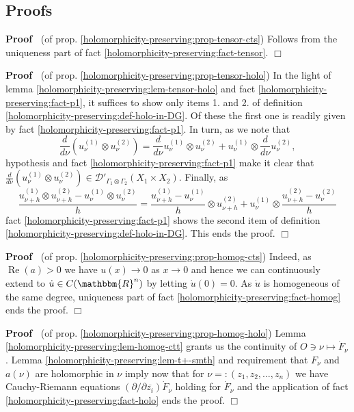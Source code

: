 \documentclass{article}
\newcommand{\nosymbol}{}
\newcommand{\tmop}[1]{\ensuremath{\operatorname{#1}}}
\renewenvironment{proof}{\noindent\textbf{Proof\ }}{\hspace*{\fill}$\Box$\medskip}
\theoremstyle{remark}
\begin{document}
\subsection{Proofs}

\begin{proof}
  (of prop. \ref{holomorphicity-preserving:prop-tensor-cts}) Follows from the
  uniqueness part of fact \ref{holomorphicity-preserving:fact-tensor}.
\end{proof}

\begin{proof}
  (of prop. \ref{holomorphicity-preserving:prop-tensor-holo}) In the light of
  lemma \ref{holomorphicity-preserving:lem-tensor-holo} and fact
  \ref{holomorphicity-preserving:fact-p1}, it suffices to show only items 1.
  and 2. of definition \ref{holomorphicity-preserving:def-holo-in-DG}. Of
  these the first one is readily given by fact
  \ref{holomorphicity-preserving:fact-p1}. In turn, as we note that
  \[ \frac{d}{d \nu} (u_{\nu}^{(1)} \otimes u_{\nu}^{(2)}) = \frac{d}{d \nu}
     u_{\nu}^{(1)} \otimes u_{\nu}^{(2)} + u_{\nu}^{(1)} \otimes \frac{d}{d
     \nu} u_{\nu}^{(2)}, \]
  hypothesis and fact \ref{holomorphicity-preserving:fact-p1} make it clear
  that $\frac{d}{d \nu} (u_{\nu}^{(1)} \otimes u_{\nu}^{(2)}) \in
  \mathcal{D}'_{\Gamma_1 \otimes \Gamma_2} (X_1 \times X_{2 \nosymbol})$.
  Finally, as
  \[ \frac{u_{\nu + h}^{(1)} \otimes u_{\nu + h}^{(2)} - u_{\nu}^{(1)} \otimes
     u_{\nu}^{(2)}}{h} = \frac{u_{\nu + h}^{(1)} - u_{\nu}^{(1)}}{h} \otimes
     u_{\nu + h}^{(2)} + u_{\nu}^{(1)} \otimes \frac{u_{\nu + h}^{(2)} -
     u_{\nu}^{(2)}}{h} \]
  fact \ref{holomorphicity-preserving:fact-p1} shows the second item of
  definition \ref{holomorphicity-preserving:def-holo-in-DG}. This ends the
  proof.
\end{proof}

\begin{proof}
  (of prop. \ref{holomorphicity-preserving:prop-homog-cts}) Indeed, as
  $\tmop{Re} (a) > 0$ we have $u (x) \rightarrow 0$ as $x \rightarrow 0$ and
  hence we can continuously extend to $\dot{u} \in C (\mathbbm{R}^n)$ by
  letting $\dot{u} (0) = 0$. As $\dot{u}$ is homogeneous of the same degree,
  uniqueness part of fact \ref{holomorphicity-preserving:fact-homog} ends the
  proof.
\end{proof}

\begin{proof}
  (of prop. \ref{holomorphicity-preserving:prop-homog-holo}) Lemma
  \ref{holomorphicity-preserving:lem-homog-ctt} grants us the continuity of $O
  \ni \nu \mapsto \dot{F}_{\nu}$. Lemma
  \ref{holomorphicity-preserving:lem-t+-smth} and requirement that $F_{\nu}$
  and $a (\nu)$ are holomorphic in $\nu$ imply now that for $\nu = : (z_1,
  z_2, \ldots, z_n)$ we have Cauchy-Riemann equations $(\partial / \partial
  \overline{z_i}) \dot{F}_{\nu}$ holding for $\dot{F}_{\nu}$ and the
  application of fact \ref{holomorphicity-preserving:fact-holo} ends the
  proof.
\end{proof}
\end{document}
